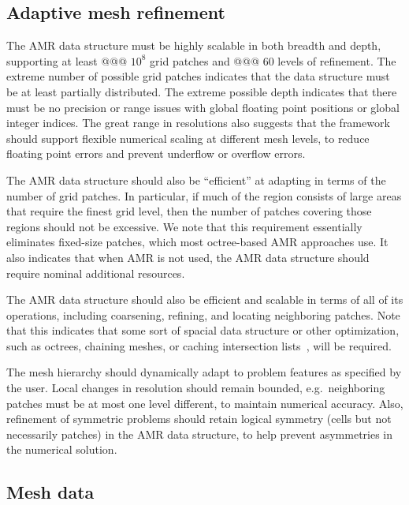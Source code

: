 \documentclass[10pt]{article}
\begin{document}
\subsection{Adaptive mesh refinement} \label{ss:require-amr}

The AMR data structure must be highly scalable in both breadth and
depth, supporting at least @@@ $10^8$ grid patches and @@@ $60$ levels
of refinement.  The extreme number of possible grid patches indicates
that the data structure must be at least partially distributed.  The
extreme possible depth indicates that there must be no precision or
range issues with global floating point positions or global integer
indices.  The great range in resolutions also suggests that the
framework should support flexible numerical scaling at different mesh
levels, to reduce floating point errors and prevent underflow or
overflow errors.

The AMR data structure should also be ``efficient'' at adapting in
terms of the number of grid patches.  In particular, if much of the
region consists of large areas that require the finest grid level,
then the number of patches covering those regions should not be
excessive.  We note that this requirement essentially eliminates
fixed-size patches, which most octree-based AMR approaches use.  It
also indicates that when AMR is not used, the AMR data structure should
require nominal additional resources.

The AMR data structure should also be efficient and scalable in terms
of all of its operations, including coarsening, refining, and locating
neighboring patches.  Note that this indicates that some sort of
spacial data structure or other optimization, such as octrees,
chaining meshes, or caching intersection lists~\cite{StSh09}, will be
required.

The mesh hierarchy should dynamically adapt to problem features as
specified by the user.  Local changes in resolution should remain
bounded, e.g.~neighboring patches must be at most one level different,
to maintain numerical accuracy.  Also, refinement of symmetric
problems should retain logical symmetry (cells but not necessarily
patches) in the AMR data structure, to help prevent asymmetries in the
numerical solution.


\subsection{Mesh data} \label{ss:require-fields}
\end{document}
